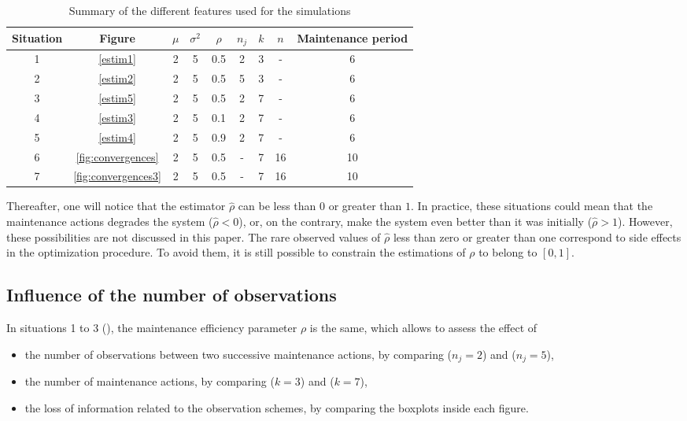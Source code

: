 \begin{table} [!h]
\caption{Summary of the different features used for the simulations}
\centering
\label{table:para}
\begin{tabular}{|c|c|c|c|c|c|c|c|c|}
\hline
Situation & Figure& $\mu$ & $\sigma^2$ & $\rho$ & $n_j$ & $k$ & $n$  & Maintenance period\\
\hline
1&\ref{estim1} & 2&5&0.5&2&3&-&6\\
2&\ref{estim2}&2 &5 &0.5 &5 &3&-&6  \\
3&\ref{estim5} &2&5&0.5&2&7&-&6\\
4&\ref{estim3}&2 &5 &0.1 &2 &7&-&6 \\
5&\ref{estim4} &2 & 5& 0.9& 2& 7&-&6\\
6&\ref{fig:convergences} &2&5&0.5&-&7&16&10\\
7&\ref{fig:convergences3}&2&5&0.5&-&7&16&10\\
\hline
\end{tabular}
\end{table}

Thereafter, one will notice that the estimator $\hat \rho$ can be less than $0$ or greater than $1$. In practice, these situations could mean that the maintenance actions degrades the system ($\hat \rho<0$), or, on the contrary, make the system even better than it was initially ($\hat \rho>1$). However, these possibilities are not discussed in this paper. The rare observed values of $\hat{\rho}$ less than zero or greater than one correspond to side effects in the optimization procedure. To avoid them, it is still possible to constrain the estimations of $ \rho $ to belong to $[0,1]$. 




\subsection{Influence of the number of observations}


In situations 1 to 3 (), the maintenance efficiency parameter $\rho$ is the same, which allows to assess the effect of 
\begin{itemize}
\item the number of observations between two successive maintenance actions, by comparing   ($n_j=2$) and  ($n_j=5$),
\item the number of maintenance actions, by comparing  ($k=3$) and  ($k=7$),
\item the loss of information related to the observation schemes, by comparing the boxplots inside each figure.

\end{itemize}



